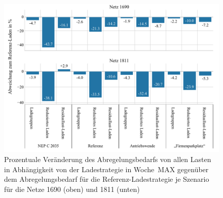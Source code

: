 \begin{figure}[H]
    \centering
    \includegraphics[width=\textwidth]{Bilder/1690_1811_cur_load_grid_week_B}
    \caption{Prozentuale Veränderung des Abregelungsbedarfs von allen Lasten in Abhängigkeit von der Ladestrategie in Woche~MAX gegenüber dem Abregelungsbedarf für die Referenz-Ladestrategie je Szenario für die Netze \num{1690} (oben) und \num{1811} (unten)}\label{fig:1690_1811_cur_load_grid_week_B}
\end{figure}